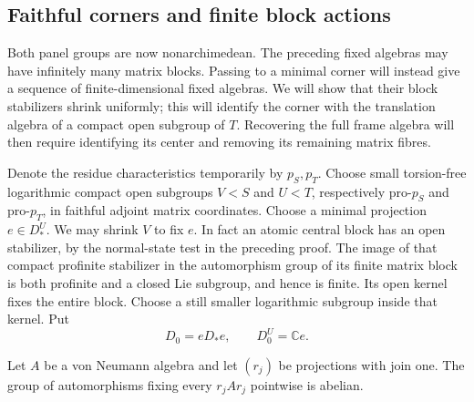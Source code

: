 \subsection{Faithful corners and finite block actions}

Both panel groups are now nonarchimedean.  The preceding fixed algebras
may have infinitely many matrix blocks.  Passing to a minimal corner
will instead give a sequence of finite-dimensional fixed algebras.  We
will show that their block stabilizers shrink uniformly; this will
identify the corner with the translation algebra of a compact open
subgroup of $T$.  Recovering the full frame algebra will then require
identifying its center and removing its remaining matrix fibres.

Denote the residue characteristics temporarily by $p_S,p_T$.  Choose
small torsion-free logarithmic compact open subgroups $V<S$ and $U<T$,
respectively pro-$p_S$ and pro-$p_T$, in faithful adjoint matrix
coordinates.  Choose a minimal projection $e\in D_*^U$.
We may shrink $V$ to fix $e$.  In fact an atomic central block has an
open stabilizer, by the normal-state test in the preceding proof.
The image of that compact profinite stabilizer in the automorphism
group of its finite matrix block is both profinite and a closed Lie
subgroup, and hence is finite.  Its open kernel fixes the entire
block.  Choose a still smaller logarithmic subgroup inside that kernel.
Put
\begin{equation}
 D_0=eD_*e,\qquad D_0^U=\mathbb Ce.
 \label{eq:finite-corner}
\end{equation}

\begin{lemma}
\label{lem:finite-corner-automorphisms}
Let $A$ be a von Neumann algebra and let $(r_j)$ be projections with
join one.  The group of automorphisms fixing every $r_jAr_j$
pointwise is abelian.
\end{lemma}

